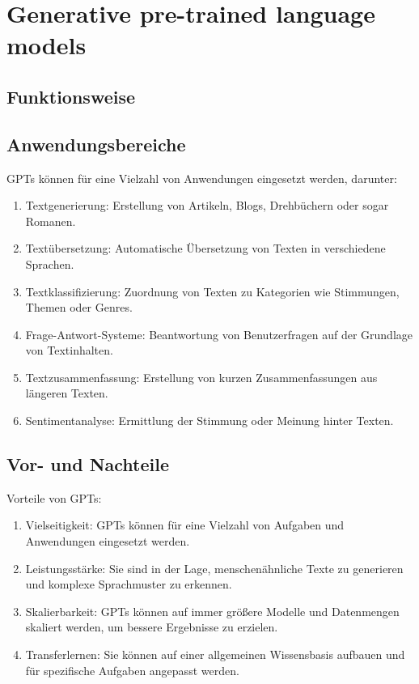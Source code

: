 \section{Generative pre-trained language models}

\subsection{Funktionsweise}

\subsection{Anwendungsbereiche}

GPTs können für eine Vielzahl von Anwendungen eingesetzt werden, darunter:

\begin{enumerate}
    \item Textgenerierung: Erstellung von Artikeln, Blogs, Drehbüchern oder sogar Romanen.
    \item Textübersetzung: Automatische Übersetzung von Texten in verschiedene Sprachen.
    \item Textklassifizierung: Zuordnung von Texten zu Kategorien wie Stimmungen, Themen oder Genres.
    \item Frage-Antwort-Systeme: Beantwortung von Benutzerfragen auf der Grundlage von Textinhalten.
    \item Textzusammenfassung: Erstellung von kurzen Zusammenfassungen aus längeren Texten.
    \item Sentimentanalyse: Ermittlung der Stimmung oder Meinung hinter Texten.
\end{enumerate}

\subsection{Vor- und Nachteile}

Vorteile von GPTs:
\begin{enumerate}
    \item Vielseitigkeit: GPTs können für eine Vielzahl von Aufgaben und Anwendungen eingesetzt werden.
    \item Leistungsstärke: Sie sind in der Lage, menschenähnliche Texte zu generieren und komplexe Sprachmuster zu erkennen.
    \item Skalierbarkeit: GPTs können auf immer größere Modelle und Datenmengen skaliert werden, um bessere Ergebnisse zu erzielen.
    \item Transferlernen: Sie können auf einer allgemeinen Wissensbasis aufbauen und für spezifische Aufgaben angepasst werden.
\end{enumerate}

